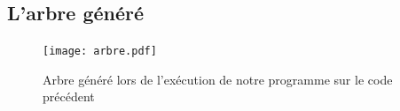 \documentclass[11pt]{article}
\begin{document}
\begin{appendix}
\begin{lstlisting}[caption={Code d'un programme de test}]
\end{lstlisting}


\vspace{0.5cm}

\subsection{L'arbre généré}
\begin{figure}[H]
	\hspace{-0.7cm} \texttt{[image: arbre.pdf]}
	\caption{Arbre généré lors de l'exécution de notre programme sur le code précédent}
	
\end{figure}

\end{appendix}
\end{document}
